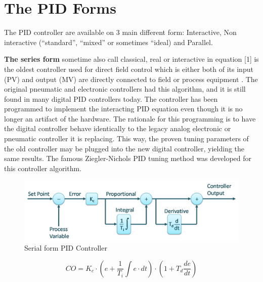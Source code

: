 \section{The PID Forms}

The PID controller are available on 3 main different form: Interactive, Non interactive (“standard”, “mixed” or sometimes “ideal) and Parallel.  

\textbf{The series form} sometime also call classical, real or interactive in equation [1] is the oldest controller used for direct field control which is either both of its input (PV) and output (MV) are directly connected to field or process equipment \cite{Wolfgang}. The original pneumatic and electronic controllers had this algorithm, and it is still found in many digital PID controllers today. The controller has been programmed to implement the interacting PID equation even though it is no longer an artifact of the hardware. The rationale for this programming is to have the digital controller behave identically to the legacy analog electronic or pneumatic controller it is replacing. This way, the proven tuning parameters of the old controller may be plugged into the new digital controller, yielding the same results.  
The famous Ziegler-Nichols PID tuning method was developed for this controller algorithm. 

\begin{figure}[H]
	\centering
	\includegraphics[width=0.8\columnwidth]{Pictures/series.png}
	\caption[Short title]{Serial form PID Controller \cite{PID}}
	\label{figure: Serial PID}
\end{figure}

\begin{equation}
\label{eqn:1}
    CO = K_c\cdot\left(e + \frac{1}{T_i}\int e\cdot dt \right)\cdot \left(1 + T_d\frac{de}{dt} \right)
\end{equation}




